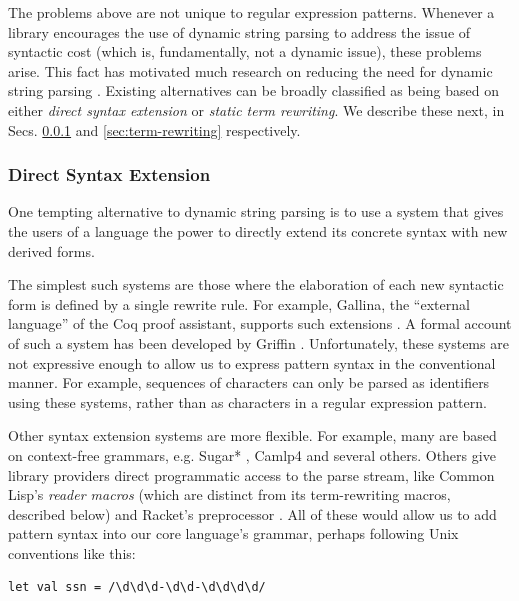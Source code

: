 The problems above are not unique to regular expression patterns. Whenever a library encourages the use of dynamic string parsing to address the issue of syntactic cost (which is, fundamentally, not a dynamic issue), these problems arise. %
	This fact has motivated much research on reducing the need for dynamic string parsing \cite{Bravenboer:2007:PIA:1289971.1289975}. Existing alternatives can be broadly classified as being based on either \emph{direct syntax extension} or \emph{static term rewriting}. We describe these next, in Secs. \ref{sec:syntax-extension} and \ref{sec:term-rewriting} respectively.%

\subsubsection{Direct Syntax Extension}\label{sec:syntax-extension}
One tempting alternative to dynamic string parsing is to use a system that gives the users of a language the power to directly extend its concrete syntax with new derived forms. %

The simplest such systems are those where the elaboration of each new syntactic form is defined by a single rewrite rule. For example, Gallina, the ``external language'' of the Coq proof assistant, supports such extensions \cite{Coq:manual}. A formal account of such a system has been developed by Griffin \cite{5134}. Unfortunately, these systems are not expressive enough to allow us to express pattern syntax in the conventional manner. For example, sequences of characters  can only be parsed as identifiers using these systems, rather than as characters in a regular expression pattern. 

Other syntax extension systems are more flexible. For example, many are based on context-free grammars, e.g.  Sugar* \cite{erdweg2013framework}, Camlp4 \cite{ocaml-manual} and several others. Others give library providers direct programmatic access to the parse stream, like Common Lisp's \emph{reader macros} \cite{steele1990common} (which are distinct from its term-rewriting macros, described below) and Racket's preprocessor \cite{Flatt:2012:CLR:2063176.2063195}. All of these would allow us to add pattern syntax into our core language's grammar, perhaps following Unix conventions like this:
\begin{lstlisting}[numbers=none]
let val ssn = /\d\d\d-\d\d-\d\d\d\d/
\end{lstlisting}

